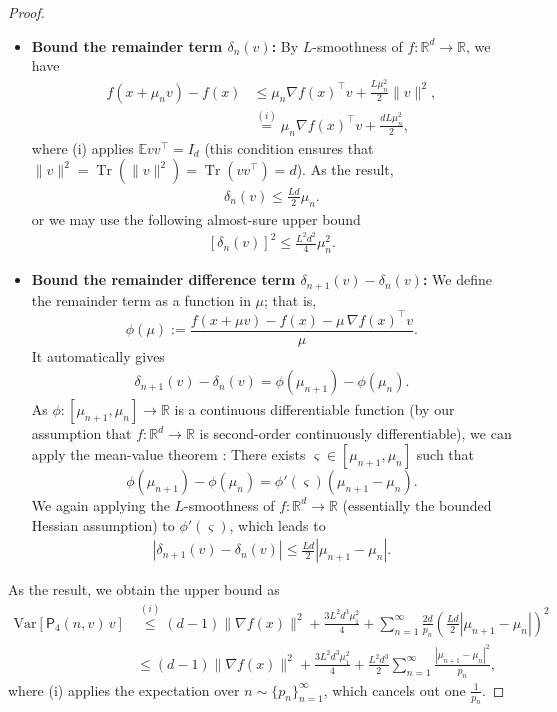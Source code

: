 \documentclass{article}
\newcommand{\Var}{\mathrm{Var}}
\newcommand{\EE}{\mathbb{E}}
\newcommand{\RR}{\mathbb{R}}
\theoremstyle{definition}
\theoremstyle{plain}
\theoremstyle{remark}
\begin{document}
\begin{proof}
\begin{itemize}
    \item \textbf{Bound the remainder term $\delta_n(v)$: } By $L$-smoothness of $f:\RR^d \to \RR$, we have
\begin{align} 
    f(x+\mu_n v) - f(x) &\leq  \mu_n \nabla f(x)^\top v + \frac{L \mu_n^2}{2} \|v\|^2 ,\nonumber\\ 
    &\overset{(i)}{=} \mu_n \nabla f(x)^\top v + \frac{dL \mu_n^2}{2}  , \nonumber
\end{align}
where (i) applies  $\EE vv^\top = I_d$ (this condition ensures that $\| v \|^2=\operatorname{Tr}\left(\| v \|^2\right) = \operatorname{Tr}\left( vv^\top \right) = d$).  As the result,
\begin{align}\label{eq:delta}
    \delta_n(v) \leq \frac{Ld}{2} \mu_n.
\end{align} 
or we may use the following almost-sure upper bound
\begin{align*} 
   \left[  \delta_n(v) \right]^2 \leq \frac{L^2d^2}{4} \mu_n^2.
\end{align*} 


    \item  \textbf{Bound the remainder difference term $\delta_{n+1}(v) - \delta_{n}(v) $: }  We define the remainder term as a function in $\mu$; that is,
    $$\phi(\mu):= \frac{f(x+\mu v)-f(x)-\mu\,\nabla f(x)^\top v}{\mu}.$$
    It automatically gives
    \begin{align*}
        \delta_{n+1}(v) -  \delta_{n}(v)  = \phi(\mu_{n+1}) - \phi(\mu_{n}).
    \end{align*}
    As $\phi: [\mu_{n+1}, \mu_{n}] \to \RR$ is a continuous differentiable function (by our assumption that $f:\RR^d \to \RR$ is second-order continuously differentiable), we can apply the mean-value theorem \citep{Folland_Taylor2024}: There exists $\varsigma \in [\mu_{n+1}, \mu_{n}]$ such that
    $$\phi(\mu_{n+1}) - \phi(\mu_{n}) = \phi'(\varsigma) (\mu_{n+1} - \mu_{n}).$$
    We again applying the $L$-smoothness of $f:\RR^d \to \RR$ (essentially the bounded Hessian assumption) to $\phi'(\varsigma)$, which leads to
    \begin{align}\label{eq:delta-difference}
        |\delta_{n+1}(v) -  \delta_{n}(v) | \leq \frac{Ld}{2}| \mu_{n+1} - \mu_{n}|.
    \end{align} 
\end{itemize}
As the result, we obtain the upper bound as 
\begin{align*}
      \Var[\mathsf P_4(n,v)\,v  ] &\overset{(i)}{\leq } (d-1) \| \nabla f(x) \|^2 + \frac{3L^2 d^3 \mu_1^2}{4}   + \sum_{n=1}^\infty \frac{2d}{p_n} \left(  \frac{Ld}{2} | \mu_{n+1} - \mu_{n}|\right)^2\\
      &\leq (d-1) \| \nabla f(x) \|^2 + \frac{3L^2 d^3 \mu_1^2}{4}  +  \frac{L^2 d^3}{2}\sum_{n=1}^\infty \frac{| \mu_{n+1} - \mu_{n}|^2}{p_n} ,
\end{align*} 
where (i) applies the expectation over $n\sim \{p_n\}_{n=1}^\infty$, which cancels out one $\frac{1}{p_n}$. 
\end{proof}
\end{document}
